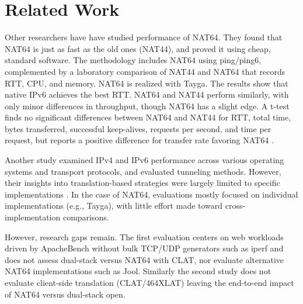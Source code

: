 \chapter{Related Work}

Other researchers have have studied performance of NAT64. They found that NAT64 is just as fast as the old ones (NAT44), and proved it using cheap, standard software\cite{llanto2012performance}. The methodology includes NAT64 using ping/ping6, complemented by a laboratory comparison of NAT44 and NAT64 that records RTT, CPU, and memory\cite{llanto2012performance}. NAT64 is realized with Tayga. The results show that native IPv6 achieves the best RTT. NAT64 and NAT44 perform similarly, with only minor differences in throughput, though NAT64 has a slight edge\cite{llanto2012performance}. A t-test finds no significant differences between NAT64 and NAT44 for RTT, total time, bytes transferred, successful keep-alives, requests per second, and time per request, but reports a positive difference for transfer rate favoring NAT64 \cite{llanto2012performance}.


Another study examined IPv4 and IPv6 performance across various operating systems and transport protocols, and evaluated tunneling methods. However, their insights into translation-based strategies were largely limited to specific implementations \cite{quintero2016performance}. In the case of NAT64, evaluations mostly focused on individual implementations (e.g., Tayga), with little effort made toward cross-implementation comparisons\cite{quintero2016performance}.


However, research gaps remain. The first evaluation\cite{llanto2012performance} centers on web workloads driven by ApacheBench without bulk TCP/UDP generators such as iperf and does not assess dual-stack versus NAT64 with CLAT, nor evaluate alternative NAT64 implementations such as Jool. Similarly the second study\cite{quintero2016performance} does not evaluate client-side translation (CLAT/464XLAT) leaving the end-to-end impact of NAT64 versus dual-stack open\cite{llanto2012performance,quintero2016performance}.
